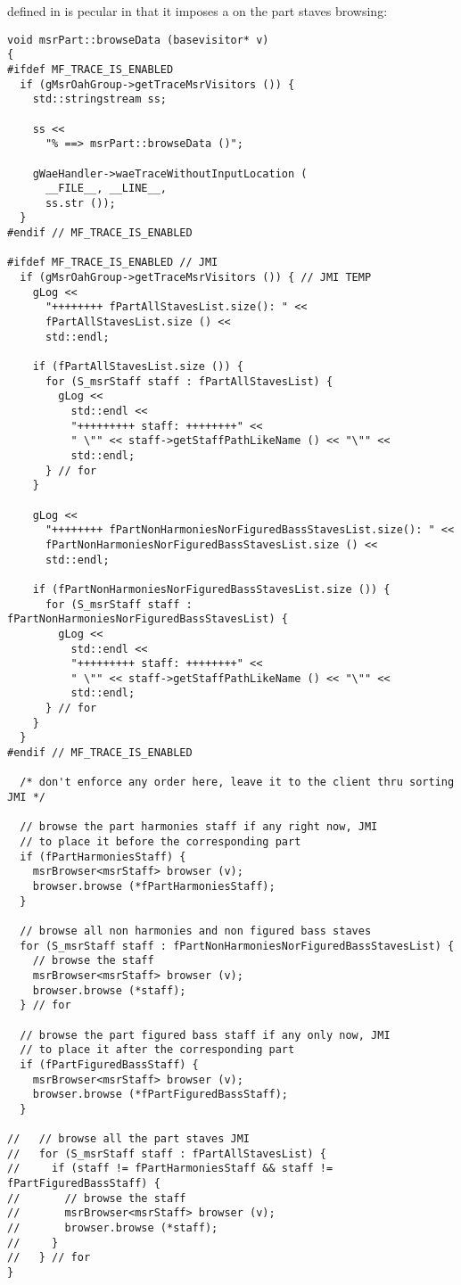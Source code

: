  defined in  is pecular in that it imposes a  on the part staves browsing: %
\begin{lstlisting}[language=CPlusPlus]
void msrPart::browseData (basevisitor* v)
{
#ifdef MF_TRACE_IS_ENABLED
  if (gMsrOahGroup->getTraceMsrVisitors ()) {
    std::stringstream ss;

    ss <<
      "% ==> msrPart::browseData ()";

    gWaeHandler->waeTraceWithoutInputLocation (
      __FILE__, __LINE__,
      ss.str ());
  }
#endif // MF_TRACE_IS_ENABLED

#ifdef MF_TRACE_IS_ENABLED // JMI
  if (gMsrOahGroup->getTraceMsrVisitors ()) { // JMI TEMP
    gLog <<
      "++++++++ fPartAllStavesList.size(): " <<
      fPartAllStavesList.size () <<
      std::endl;

    if (fPartAllStavesList.size ()) {
      for (S_msrStaff staff : fPartAllStavesList) {
        gLog <<
          std::endl <<
          "+++++++++ staff: ++++++++" <<
          " \"" << staff->getStaffPathLikeName () << "\"" <<
          std::endl;
      } // for
    }

    gLog <<
      "++++++++ fPartNonHarmoniesNorFiguredBassStavesList.size(): " <<
      fPartNonHarmoniesNorFiguredBassStavesList.size () <<
      std::endl;

    if (fPartNonHarmoniesNorFiguredBassStavesList.size ()) {
      for (S_msrStaff staff : fPartNonHarmoniesNorFiguredBassStavesList) {
        gLog <<
          std::endl <<
          "+++++++++ staff: ++++++++" <<
          " \"" << staff->getStaffPathLikeName () << "\"" <<
          std::endl;
      } // for
    }
  }
#endif // MF_TRACE_IS_ENABLED

  /* don't enforce any order here, leave it to the client thru sorting JMI */

  // browse the part harmonies staff if any right now, JMI
  // to place it before the corresponding part
  if (fPartHarmoniesStaff) {
    msrBrowser<msrStaff> browser (v);
    browser.browse (*fPartHarmoniesStaff);
  }

  // browse all non harmonies and non figured bass staves
  for (S_msrStaff staff : fPartNonHarmoniesNorFiguredBassStavesList) {
    // browse the staff
    msrBrowser<msrStaff> browser (v);
    browser.browse (*staff);
  } // for

  // browse the part figured bass staff if any only now, JMI
  // to place it after the corresponding part
  if (fPartFiguredBassStaff) {
    msrBrowser<msrStaff> browser (v);
    browser.browse (*fPartFiguredBassStaff);
  }

//   // browse all the part staves JMI
//   for (S_msrStaff staff : fPartAllStavesList) {
//     if (staff != fPartHarmoniesStaff && staff != fPartFiguredBassStaff) {
//       // browse the staff
//       msrBrowser<msrStaff> browser (v);
//       browser.browse (*staff);
//     }
//   } // for
}
\end{lstlisting}


